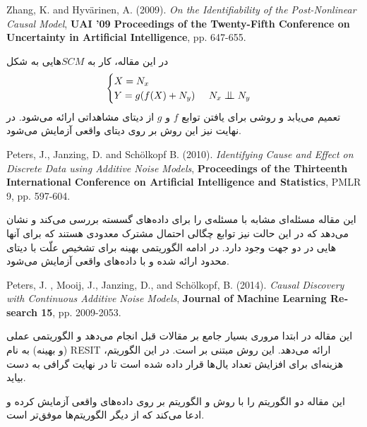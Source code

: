 \documentclass{article}
\begin{document}
\begin{enumerate}
\begin{latin}
\item Zhang, K. and Hyvärinen, A. (2009). 
\textit{On the Identifiability of the Post-Nonlinear Causal Model}, \textbf{}
\textbf{UAI '09 Proceedings of the Twenty-Fifth Conference on Uncertainty in Artificial Intelligence}, pp. 647-655.
\end{latin}
در این مقاله، کار
به $SCM$هایی به شکل 
\begin{equation}
\begin{cases}
X = N_x \\
Y = g(f(X) + N_y) \;\;\;\;\; N_x \bigCI N_y
\end{cases}
\end{equation}
تعمیم می‌یابد و روشی برای یافتن توابع $f$ و $g$ از دیتای مشاهداتی ارائه می‌شود. در نهایت نیز این روش بر روی دیتای واقعی آزمایش می‌شود.
\vspace{1cm}
\begin{latin}
\item Peters, J., Janzing, D. and Sch{\"o}lkopf B. (2010).
\textit{Identifying Cause and Effect on Discrete Data using Additive Noise Models}, 
\textbf{Proceedings of the Thirteenth International Conference on Artificial Intelligence and Statistics}, PMLR 9, pp. 597-604.
\end{latin}
این مقاله مسئله‌ای مشابه با مسئله‌ی 
را برای داده‌های گسسته بررسی می‌کند و نشان می‌دهد که در این حالت نیز توابع چگالی احتمال مشترک معدودی هستند که برای آنها  هایی در دو جهت وجود دارد. در ادامه الگوریتمی بهینه برای تشخیص علّت با دیتای محدود ارائه شده و با  داده‌های واقعی آزمایش می‌شود.
\vspace{1cm}
\begin{latin}
Peters, J. , Mooij, J., Janzing, D., and Sch{\"o}lkopf, B.  (2014).
\textit{Causal Discovery with Continuous Additive Noise Models}, \textbf{Journal of Machine Learning Research 15}, pp. 2009-2053.
\end{latin}
این مقاله در ابتدا مروری بسیار جامع بر مقالات قبل انجام می‌دهد و الگوریتمی عملی (و بهینه) به نام RESIT ارائه می‌دهد. این روش مبتنی بر 
 است. در این الگوریتم،  هزینه‌ای برای افزایش تعداد یال‌ها قرار داده شده است تا در نهایت  گرافی 
به دست بیاید.

این مقاله دو  الگوریتم  را با روش  و الگوریتم  بر روی داده‌های واقعی آزمایش کرده و ادعا می‌کند که  از دیگر الگوریتم‌ها موفق‌تر است.



\end{enumerate}
\end{document}
